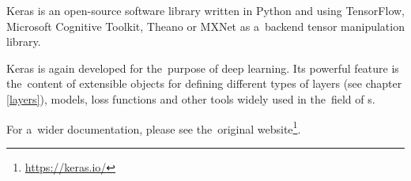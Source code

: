 Keras is an open-source software library written in Python and using TensorFlow, 
Microsoft Cognitive Toolkit, Theano or MXNet as a~backend tensor manipulation 
library.

Keras is again developed for the~purpose of deep learning. Its powerful feature 
is the~content of extensible objects for defining different types of layers (see 
chapter \ref{layers}), models, loss functions and other tools widely used in
the~field of s.

For a~wider documentation, please see the~original 
website\footnote{\url{https://keras.io/}}.
